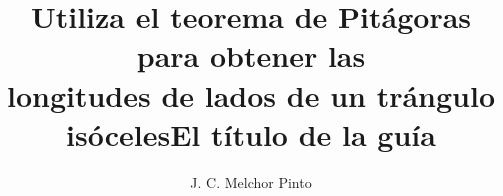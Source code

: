 \documentclass[12pt,addpoints,answers]{guia}
\title{Utiliza el teorema de Pitágoras para obtener las \\longitudes de lados de un trángulo isóceles}
\title{El título de la guía}
\author{J. C. Melchor Pinto}
\begin{document}
\pagestyle{headandfoot}

\INFO
\begin{multicols}{2}
    
    
    
    \columnbreak
    
\end{multicols}
\begin{questions}
    \questionboxed[10]{}
    \questionboxed[10]{}
    \questionboxed[10]{}
    \questionboxed[10]{}
    \questionboxed[10]{}
    \questionboxed[10]{}
    \questionboxed[10]{}
    \questionboxed[10]{}
    \questionboxed[10]{}
    \questionboxed[10]{}
    \questionboxed[10]{}
    \questionboxed[10]{}
    \questionboxed[10]{}
    \questionboxed[10]{}
\end{questions}
\end{document}
